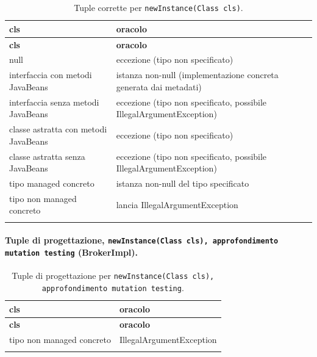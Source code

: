 {\footnotesize\setlength{\tabcolsep}{3pt}
\begin{longtable}{>{\raggedright\arraybackslash}p{}>{\raggedright\arraybackslash}p{}}
\toprule
\textbf{cls} & \textbf{oracolo} \\
\midrule
\endfirsthead
\toprule
\textbf{cls} & \textbf{oracolo} \\
\midrule
\endhead
\bottomrule
\endfoot
null & eccezione (tipo non specificato) \\
interfaccia con metodi JavaBeans & istanza non-null (implementazione concreta generata dai metadati) \\
interfaccia senza metodi JavaBeans & eccezione (tipo non specificato, possibile IllegalArgumentException) \\
classe astratta con metodi JavaBeans & eccezione (tipo non specificato) \\
classe astratta senza JavaBeans & eccezione (tipo non specificato, possibile IllegalArgumentException) \\
tipo managed concreto & istanza non-null del tipo specificato \\
tipo non managed concreto & lancia IllegalArgumentException \\
\bottomrule
\caption{Tuple corrette per \texttt{newInstance(Class cls)}.}
\label{tab:newinstance-tuple-corrette}
\end{longtable}
}



\paragraph*{Tuple di progettazione, \texttt{newInstance(Class cls), approfondimento mutation testing} (BrokerImpl).}

{\footnotesize\setlength{\tabcolsep}{3pt}
\begin{longtable}{>{\raggedright\arraybackslash}p{}>{\raggedright\arraybackslash}p{}}
\toprule
\textbf{cls} & \textbf{oracolo} \\
\midrule
\endfirsthead
\toprule
\textbf{cls} & \textbf{oracolo} \\
\midrule
\endhead
\bottomrule
\endfoot
tipo non managed concreto & IllegalArgumentException \\
\bottomrule
\caption{Tuple di progettazione per \texttt{newInstance(Class cls), approfondimento mutation testing}.}
\label{tab:newinstance2-tuple}
\end{longtable}
}



